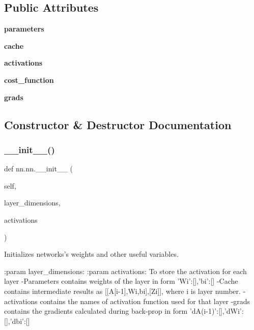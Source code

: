 \subsection*{Public Attributes}
\begin{DoxyCompactItemize}
\item 
\mbox{\label{classnn_1_1nn_a69da89bd6d17dbc8596ab586b7678237}} 
{\bfseries parameters}
\item 
\mbox{\label{classnn_1_1nn_a1f75a6242fc9ee82ca2632e18979b4d3}} 
{\bfseries cache}
\item 
\mbox{\label{classnn_1_1nn_acb7fb4cc0db120b007ef1ab1f82d7ba0}} 
{\bfseries activations}
\item 
\mbox{\label{classnn_1_1nn_adb4a96a154d03db3722022600e134c7f}} 
{\bfseries cost\+\_\+function}
\item 
\mbox{\label{classnn_1_1nn_a50e9804c2895867c31833f877c7d5d60}} 
{\bfseries grads}
\end{DoxyCompactItemize}


\subsection{Constructor \& Destructor Documentation}
\mbox{\label{classnn_1_1nn_ad7304c7932970a07bf2869e97b79e0b5}} 
\subsubsection{\texorpdfstring{\+\_\+\+\_\+init\+\_\+\+\_\+()}{\_\_init\_\_()}}
{\footnotesize\ttfamily def nn.\+nn.\+\_\+\+\_\+init\+\_\+\+\_\+ (\begin{DoxyParamCaption}\item[{}]{self,  }\item[{}]{layer\+\_\+dimensions,  }\item[{}]{activations }\end{DoxyParamCaption})}

\begin{DoxyVerb}Initializes networks's weights and other useful variables.

:param layer_dimensions:
:param activations: To store the activation for each layer
-Parameters contains weights of the layer in form {'Wi':[],'bi':[]}
-Cache contains intermediate results as [[A[i-1],Wi,bi],[Zi]], where i
 is layer number.
-activations contains the names of activation function used for that layer
-grads contains the gradients calculated during back-prop in form {'dA(i-1)':[],'dWi':[],'dbi':[]}
\end{DoxyVerb}
 

